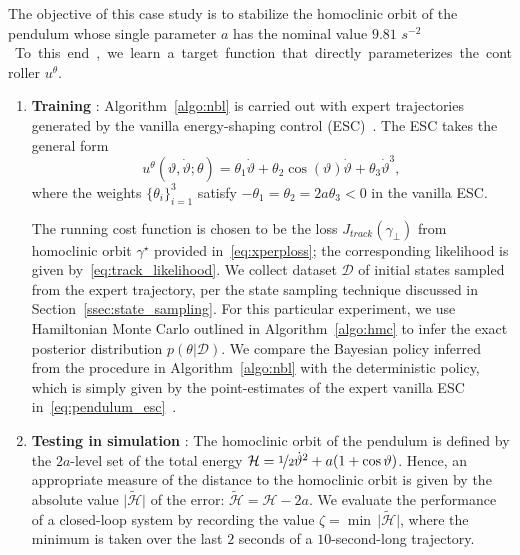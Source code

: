 The objective of this case study is to stabilize the homoclinic orbit of the
pendulum whose single parameter $a$ has the nominal value $9.81$
\unit{$s^{-2}$}. To this end, we learn a target function that directly
parameterizes the controller $u^\theta$.
\begin{enumerate}
    \item \textbf{Training} : 
    Algorithm~\ref{algo:nbl} is carried out with expert
    trajectories generated by the vanilla energy-shaping control
    (ESC)~\cite{underactuated}. The ESC takes the general form
    \begin{equation}
        u^\theta(\vartheta, \dot{\vartheta}; \theta) = \theta_1 \dot{\vartheta} + \theta_2 \cos{(\vartheta)} \dot{\vartheta} + \theta_3 \dot{\vartheta}^3,
        \label{eq:pendulum_esc}
    \end{equation}
    where the weights $\{\theta_i\}_{i=1}^3$ satisfy $-\theta_1 = \theta_2 = 2a
    \theta_3 < 0$ in the vanilla ESC. 

    The running cost function is chosen to be the loss $J_{track}(\gamma_\bot)$
    from homoclinic orbit $\gamma^\star$ provided in~\eqref{eq:xperploss}; the
    corresponding likelihood is given by~\eqref{eq:track_likelihood}. We collect
    dataset $\mathcal{D}$ of initial states sampled from the expert trajectory,
    per the state sampling technique discussed in
    Section~\ref{ssec:state_sampling}. For this particular experiment, we use
    Hamiltonian Monte Carlo outlined in Algorithm~\ref{algo:hmc} to infer the
    exact posterior distribution $p(\theta | \mathcal{D})$. We compare the
    Bayesian policy inferred from the procedure in Algorithm~\ref{algo:nbl} with
    the deterministic policy, which is simply given by the point-estimates of
    the expert vanilla ESC in~\eqref{eq:pendulum_esc}~\cite{acc}.
    \item \textbf{Testing in simulation} : 
    The homoclinic orbit of the pendulum is defined by the $2a$-level set of the
    total energy $\mathcal{H} = \nicefrac{1}{2}\dot{\vartheta}^2 + a(1 +
    \cos{\vartheta})$. Hence, an appropriate measure of the distance to the
    homoclinic orbit is given by the absolute value $\bigl| \mathcal{\tilde{H}}
    \bigr|$ of the error: $\mathcal{\tilde{H}} = \mathcal{H} - 2a$. We evaluate the
    performance of a closed-loop system by recording the value $\zeta = \min \,
    \bigl| \mathcal{\tilde{H}} \bigr|$, where the minimum is taken over the last $2$
    seconds of a $10$-second-long trajectory.



\end{enumerate}
